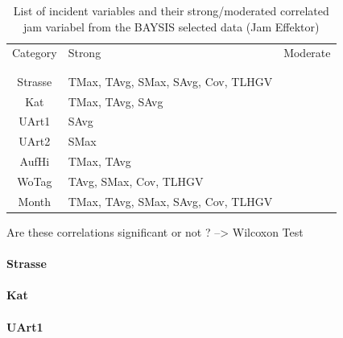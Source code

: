 \documentclass[a4paper,headsepline,footsepline,fontsize=11pt,BCOR=12mm,DIV=12]{report}
\begin{document}
\noindent
\begin{table}[h!]
	\centering
	\begin{tabular}{c|l|l}  
		Category & Strong & Moderate \\
		\\[-1em]
		\hline
		\\[-1em]
		Strasse & TMax, TAvg, SMax, SAvg, Cov, TLHGV & \\ 
 		Kat & TMax, TAvg, SAvg & \\ 
 		UArt1 & SAvg & \\
 		UArt2 & SMax & \\
 		AufHi & TMax, TAvg & \\
 		WoTag & TAvg, SMax, Cov, TLHGV & \\
 		Month & TMax, TAvg, SMax, SAvg, Cov, TLHGV & \\
	\end{tabular}
	\caption{List of incident variables and their strong/moderated correlated jam variabel from the BAYSIS selected data (Jam Effektor)}
\end{table}

Are these correlations significant or not ? --> Wilcoxon Test

\paragraph{Strasse}

\paragraph{Kat}

\paragraph{UArt1}
\end{document}
